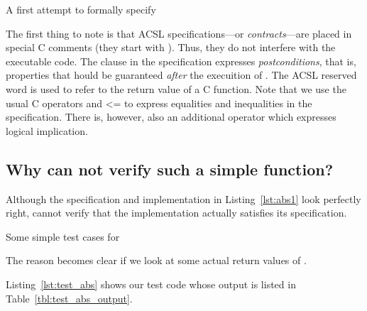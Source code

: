 \begin{listing}[hbt]
\begin{minipage}{\textwidth}

\end{minipage}
\caption{\label{lst:abs1} A first attempt to formally specify }
\end{listing}

The first thing to note is that ACSL specifications---or \emph{contracts}---are placed in special C comments
(they start with ).
Thus, they do not interfere with the executable code.
The  clause in the specification expresses \emph{postconditions},
that is, properties that hould be guaranteed \emph{after} the execuition
of .
The ACSL reserved word \inl{\\result} is used to refer to the return value of a C function.
Note that we use the usual C operators \inl{==} and {<=} to express equalities and inequalities
in the specification.
There is, however, also an additional operator \inl{==>} which expresses logical implication.

\subsection{Why can \framacwp not verify such a simple function?}

Although the specification and implementation in Listing~\ref{lst:abs1} look perfectly right, 
\framacwp cannot verify that the implementation actually satisfies its specification.


\begin{listing}[hbt]
\begin{minipage}{\textwidth}

\end{minipage}
\caption{\label{lst:test_abs} Some simple test cases for }
\end{listing}

The reason becomes clear if we look at some actual return values of .
\clearpage

Listing~\ref{lst:test_abs} shows our test code whose output is listed in Table~\ref{tbl:test_abs_output}.

